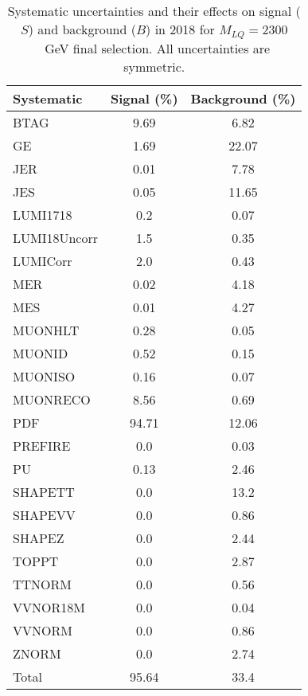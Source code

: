 \begin{table}[htbp]
\begin{center}
\caption{Systematic uncertainties and their effects on signal ($S$) and background ($B$) in 2018 for $M_{LQ}=2300$~GeV final selection. All uncertainties are symmetric.}
\begin{tabular}{lcc}
\hline\hline
Systematic & Signal (\%) & Background (\%) \\ \hline 
BTAG & 9.69 & 6.82\\ 
GE & 1.69 & 22.07\\ 
JER & 0.01 & 7.78\\ 
JES & 0.05 & 11.65\\ 
LUMI1718 & 0.2 & 0.07\\ 
LUMI18Uncorr & 1.5 & 0.35\\ 
LUMICorr & 2.0 & 0.43\\ 
MER & 0.02 & 4.18\\ 
MES & 0.01 & 4.27\\ 
MUONHLT & 0.28 & 0.05\\ 
MUONID & 0.52 & 0.15\\ 
MUONISO & 0.16 & 0.07\\ 
MUONRECO & 8.56 & 0.69\\ 
PDF & 94.71 & 12.06\\ 
PREFIRE & 0.0 & 0.03\\ 
PU & 0.13 & 2.46\\ 
SHAPETT & 0.0 & 13.2\\ 
SHAPEVV & 0.0 & 0.86\\ 
SHAPEZ & 0.0 & 2.44\\ 
TOPPT & 0.0 & 2.87\\ 
TTNORM & 0.0 & 0.56\\ 
VVNOR18M & 0.0 & 0.04\\ 
VVNORM & 0.0 & 0.86\\ 
ZNORM & 0.0 & 2.74\\ 
Total & 95.64 & 33.4\\ \hline \hline
\end{tabular}
\label{tab:SysUncertainties_uujj_2300}
\end{center}
\end{table}

